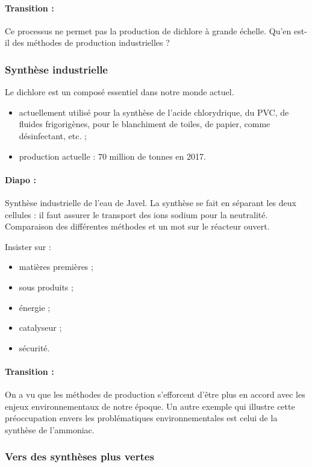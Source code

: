 \paragraph{Transition : } Ce processus ne permet pas la production de dichlore à grande échelle.
Qu'en est-il des méthodes de production industrielles ?

\subsubsection{Synthèse industrielle}

Le dichlore est un composé essentiel dans notre monde actuel.
\begin{itemize}
\item actuellement utilisé pour la synthèse de l'acide chlorydrique, du PVC, de fluides frigorigènes, pour le blanchiment de toiles, de papier, comme désinfectant, etc. ;
\item production actuelle : $70$ million de tonnes en 2017.
\end{itemize}

\paragraph{Diapo :} Synthèse industrielle de l'eau de Javel.
La synthèse se fait en séparant les deux cellules : il faut assurer le transport des ions sodium pour la neutralité.
Comparaison des différentes méthodes et un mot sur le réacteur ouvert.

Insister sur :
\begin{itemize}
\item matières premières ;
\item sous produits ;
\item énergie ;
\item catalyseur ;
\item sécurité.
\end{itemize}

\paragraph{Transition : } On a vu que les méthodes de production s'efforcent d'être plus en accord avec les enjeux environnementaux de notre époque.
Un autre exemple qui illustre cette préoccupation envers les problématiques environnementales est celui de la synthèse de l'ammoniac.

\subsubsection{Vers des synthèses plus vertes}

